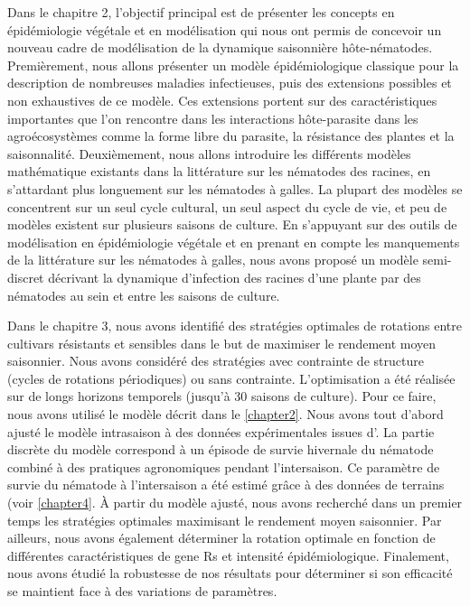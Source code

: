 	Dans le chapitre 2, l'objectif principal  est de présenter les concepts en épidémiologie végétale et en modélisation qui nous ont permis de concevoir  un nouveau cadre de modélisation de la dynamique saisonnière hôte-nématodes.  Premièrement, nous allons présenter un modèle épidémiologique classique pour la description de nombreuses maladies infectieuses, puis des extensions possibles et non exhaustives de ce modèle. Ces extensions portent sur des caractéristiques importantes  que l'on rencontre dans les interactions hôte-parasite dans les agroécosystèmes  comme la forme libre du parasite, la résistance des plantes et la saisonnalité.
Deuxièmement, nous allons introduire les différents modèles mathématique existants dans la littérature sur les nématodes des racines, en s'attardant plus longuement sur les nématodes à galles. La plupart des modèles se concentrent sur un seul cycle cultural, un seul aspect du cycle de vie, et peu de modèles existent sur plusieurs  saisons de culture. En s'appuyant sur  des outils de modélisation en épidémiologie végétale et en prenant en compte  les manquements de la littérature sur les nématodes à galles, nous avons proposé un modèle semi-discret  décrivant la dynamique d'infection des racines d'une plante par des nématodes au sein et entre les saisons de culture.

	Dans le chapitre 3,  nous avons identifié des stratégies optimales de rotations entre cultivars résistants et sensibles dans le but de maximiser le rendement moyen saisonnier. Nous avons considéré des stratégies avec contrainte de structure (cycles de rotations périodiques) ou sans contrainte. L'optimisation a été réalisée sur de longs horizons temporels (jusqu’à 30 saisons de culture). 
Pour ce faire, nous avons utilisé  le modèle décrit dans le \autoref{chapter2}. Nous avons tout d’abord ajusté le modèle intrasaison à des données expérimentales issues d’\citet{Ehwaeti1998}. La partie discrète du modèle correspond à un épisode de survie hivernale du nématode combiné à des pratiques agronomiques pendant l'intersaison. Ce paramètre de survie du nématode à l'intersaison a été estimé grâce à des données de terrains (voir \autoref{chapter4}. 
À partir du modèle ajusté, nous avons recherché dans un premier temps les stratégies optimales maximisant le rendement moyen saisonnier.
Par ailleurs, nous avons également déterminer la rotation optimale en fonction de différentes caractéristiques de \glspl{gene R}  et intensité épidémiologique.
Finalement, nous avons étudié la robustesse de nos résultats pour déterminer si son efficacité se maintient face à des variations de paramètres.
	
